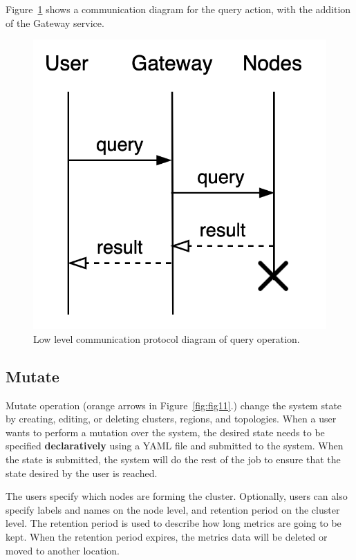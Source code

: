 Figure~\ref{fig:fig14} shows a communication diagram for the query action, with the addition of the Gateway service.

\begin{figure}[H]
	\begin{center}
		\includegraphics[scale=0.8]{images/Figure14}
	\end{center}
	\vspace{-0.7cm}
	\caption{Low level communication protocol diagram of query operation.}
	\label{fig:fig14}
\end{figure}
%
%
\subsection{Mutate}\label{sec:mutate} 
%
Mutate operation (orange arrows in Figure~\ref{fig:fig11}.) change the system state by creating, editing, or deleting clusters, regions, and topologies. When a user wants to perform a mutation over the system, the desired state needs to be specified \textbf{declaratively} using a YAML file and submitted to the system. When the state is submitted, the system will do the rest of the job to ensure that the state desired by the user is reached.

The users specify which nodes are forming the cluster. Optionally, users can also specify labels and names on the node level, and retention period on the cluster level. The retention period is used to describe how long metrics are going to be kept. When the retention period expires, the metrics data will be deleted or moved to another location. 

